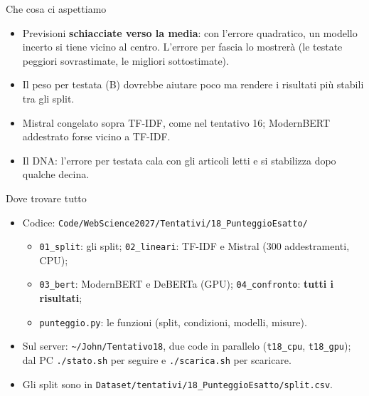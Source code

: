 \documentclass[aspectratio=169]{beamer}
\newcommand{\hl}[1]{\textbf{#1}}
\begin{document}
\begin{frame}{Che cosa ci aspettiamo}
  \vfill
  \begin{itemize}
    \setlength\itemsep{0.8em}
    \item Previsioni \hl{schiacciate verso la media}: con l'errore quadratico, un modello incerto si tiene vicino al centro.
          L'errore per fascia lo mostrer\`a (le testate peggiori sovrastimate, le migliori sottostimate).
    \item Il peso per testata (B) dovrebbe aiutare poco ma rendere i risultati pi\`u stabili tra gli split.
    \item Mistral congelato sopra TF-IDF, come nel tentativo 16; ModernBERT addestrato forse vicino a TF-IDF.
    \item Il DNA: l'errore per testata cala con gli articoli letti e si stabilizza dopo qualche decina.
  \end{itemize}
  \vfill
\end{frame}

\begin{frame}{Dove trovare tutto}
  \vfill
  \small
  \begin{itemize}
    \setlength\itemsep{0.6em}
    \item Codice: \texttt{Code/WebScience2027/Tentativi/18\_PunteggioEsatto/}
      \begin{itemize}
        \item \texttt{01\_split}: gli split; \texttt{02\_lineari}: TF-IDF e Mistral (300 addestramenti, CPU);
        \item \texttt{03\_bert}: ModernBERT e DeBERTa (GPU); \texttt{04\_confronto}: \hl{tutti i risultati};
        \item \texttt{punteggio.py}: le funzioni (split, condizioni, modelli, misure).
      \end{itemize}
    \item Sul server: \texttt{\~{}/John/Tentativo18}, due code in parallelo (\texttt{t18\_cpu}, \texttt{t18\_gpu}); dal PC
          \texttt{./stato.sh} per seguire e \texttt{./scarica.sh} per scaricare.
    \item Gli split sono in \texttt{Dataset/tentativi/18\_PunteggioEsatto/split.csv}.
  \end{itemize}
  \vfill
\end{frame}
\end{document}
